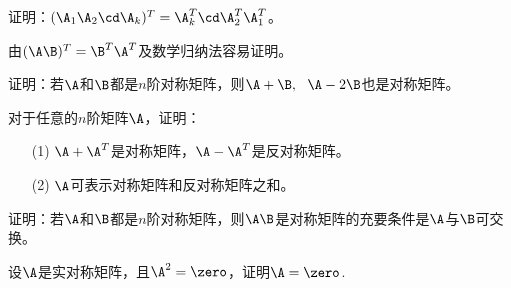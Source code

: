 \begin{frame}
  \begin{footnotesize}
    \begin{exampleblock}{34}
      证明：$(\A_1\A_2\cd\A_k)^T=\A_k^T\cd\A_2^T\A_1^T$。
    \end{exampleblock}
    \pause\proofname
    由$(\A\B)^T=\B^T\A^T$及数学归纳法容易证明。
  \end{footnotesize}
\end{frame}



\begin{frame}
  \begin{footnotesize}
    \begin{exampleblock}{35}
      证明：若$\A$和$\B$都是$n$阶对称矩阵，则$\A+\B,~~\A-2\B$也是对称矩阵。
    \end{exampleblock}
  \end{footnotesize}
\end{frame}



\begin{frame}
  \begin{footnotesize}
    \begin{exampleblock}{36}
      对于任意的$n$阶矩阵$\A$，证明：
      \begin{itemize}
      \item[(1)]$\A+\A^T$是对称矩阵，$\A-\A^T$是反对称矩阵。
      \item[(2)]$\A$可表示对称矩阵和反对称矩阵之和。
      \end{itemize}
    \end{exampleblock}
  \end{footnotesize}
\end{frame}



\begin{frame}
  \begin{footnotesize}
    \begin{exampleblock}{37}
      证明：若$\A$和$\B$都是$n$阶对称矩阵，则$\A\B$是对称矩阵的充要条件是$\A$与$\B$可交换。
    \end{exampleblock}
  \end{footnotesize}
\end{frame}


\begin{frame}
  \begin{footnotesize}
    \begin{exampleblock}{38}
      设$\A$是实对称矩阵，且$\A^2=\zero$，证明$\A=\zero$.
    \end{exampleblock}
  \end{footnotesize}
\end{frame}



